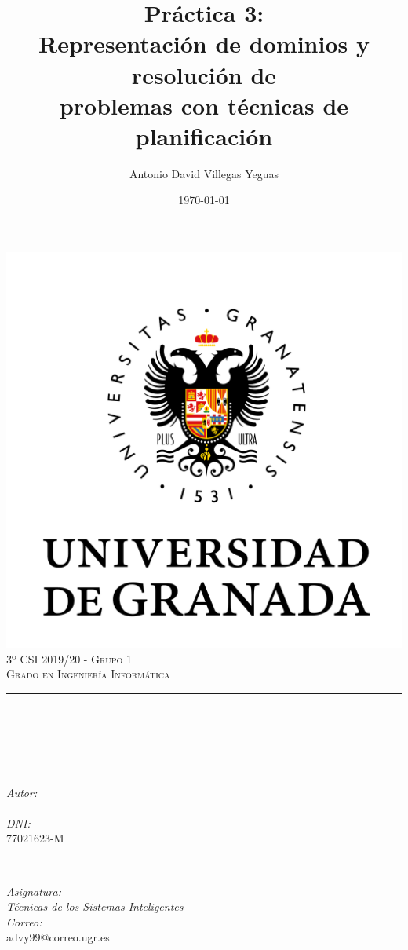 \documentclass[10pt, spanish]{article}
\title{Práctica 3:\\
 Representación de dominios y resolución de\\ problemas con técnicas de planificación  \hspace{0.05cm} }
\author{Antonio David Villegas Yeguas}
\date{\today}
\makeatletter
\let\thetitle\@title
\let\theauthor\@author
\makeatother
\begin{document}

\begin{titlepage}
    \centering
    \vspace*{0.3 cm}
    \includegraphics[scale = 0.50]{ugr.png}\\[0.7 cm]
    \textsc{\large 3º CSI 2019/20 - Grupo 1}\\[0.5 cm]            
    \textsc{\large Grado en Ingeniería Informática}\\[0.5 cm]              
    \rule{\linewidth}{0.2 mm} \\[0.2 cm]
    { \huge \bfseries \thetitle}\\
    \rule{\linewidth}{0.2 mm} \\[1 cm]
    
    \begin{minipage}{0.4\textwidth}
        \begin{flushleft} \large
            \emph{Autor:}\\
            \theauthor\\ 
			 \emph{DNI:}\\
            77021623-M
            \end{flushleft}
            \end{minipage}~
            \begin{minipage}{0.4\textwidth}
            \begin{flushright} \large
            \emph{Asignatura: \\
            Técnicas de los Sistemas Inteligentes}   \\     
            \emph{Correo:}\\
            advy99@correo.ugr.es           
        \end{flushright}
    \end{minipage}\\[0.5cm]
  

\end{titlepage}
\end{document}
